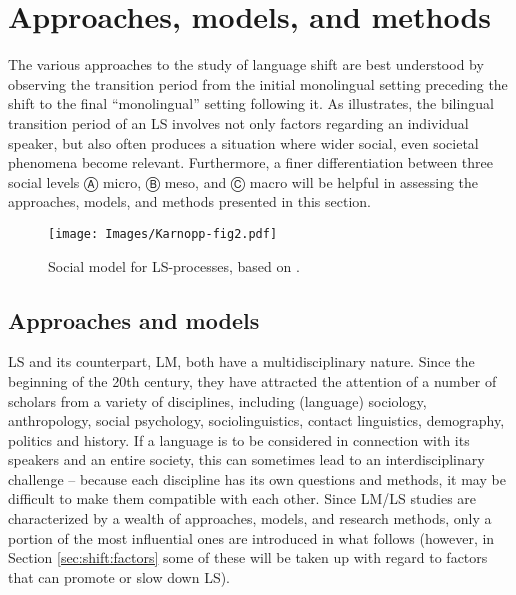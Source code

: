 \documentclass[output=paper]{langscibook}
\begin{document}
\section{Approaches, models, and methods}
\label{sec:shift:approaches}


\noindent The various approaches to the study of language shift are best understood by observing the transition period from the initial monolingual setting preceding the shift to the final ``monolingual'' setting following it. As  illustrates, the bilingual transition period of an LS involves not only factors regarding an individual speaker, but also often produces a situation where wider social, even societal phenomena become relevant. Furthermore, a finer differentiation between three social levels Ⓐ micro, Ⓑ meso, and Ⓒ macro will be helpful in assessing the approaches, models, and methods presented in this section.

\begin{figure}
\texttt{[image: Images/Karnopp-fig2.pdf]}
\caption{Social model for LS-processes, based on \textcite[63]{Sasse1992}.\label{fig:shift:figure2}}
\end{figure}

\subsection{Approaches and models}
\label{approachesmodels}

LS and its counterpart, LM, both have a multidisciplinary nature. Since the beginning of the 20th century, they have attracted the attention of a number of scholars from a variety of disciplines, including (language) sociology, anthropology, social psychology, sociolinguistics, contact linguistics, demography, politics and history. If a language is to be considered in connection with its speakers and an entire society, this can sometimes lead to an interdisciplinary challenge -- because each discipline has its own questions and methods, it may be difficult to make them compatible with each other. Since LM/LS studies are characterized by a wealth of approaches, models, and research methods, only a portion of the most influential ones are introduced in what follows (however, in Section \ref{sec:shift:factors} some of these will be taken up with regard to factors that can promote or slow down LS).
\end{document}
